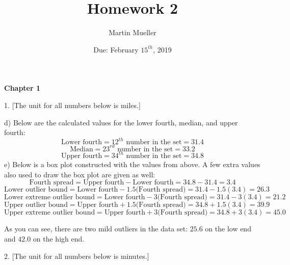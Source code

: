 \documentclass[12pt, letterpaper]{article}
\title{Homework 2}
\author{Martin Mueller}
\date{Due: February $15^{th}$, 2019}
\begin{document}
\maketitle

\begin{center}
	\textbf{Chapter 1}
\end{center}

1. [The unit for all numbers below is miles.]

\qquad d) Below are the calculated values for the lower fourth, median, and upper fourth:
$$\text{Lower fourth}=12^{th}\text{ number in the set}=\boxed{31.4}$$
$$\text{Median}=23^{rd}\text{ number in the set}=\boxed{33.2}$$
$$\text{Upper fourth}=34^{th}\text{ number in the set}=\boxed{34.8}$$
\qquad e) Below is a box plot constructed with the values from above. A few extra values also used to draw the box plot are given as well:
$$\text{Fourth spread}=\text{Upper fourth}-\text{Lower fourth}=34.8-31.4=\boxed{3.4}$$
$$\text{Lower outlier bound}=\text{Lower fourth}-1.5\text{(Fourth spread)}=31.4-1.5(3.4)=\boxed{26.3}$$
$$\text{Lower extreme outlier bound}=\text{Lower fourth}-3\text{(Fourth spread)}=31.4-3(3.4)=\boxed{21.2}$$
$$\text{Upper outlier bound}=\text{Upper fourth}+1.5\text{(Fourth spread)}=34.8+1.5(3.4)=\boxed{39.9}$$
$$\text{Upper extreme outlier bound}=\text{Upper fourth}+3\text{(Fourth spread)}=34.8+3(3.4)=\boxed{45.0}$$
\begin{center}
\end{center}

As you can see, there are two mild outliers in the data set: $25.6$ on the low end and $42.0$ on the high end.

\pagebreak

2. [The unit for all numbers below is minutes.]
\end{document}
